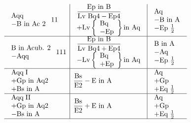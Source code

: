\documentclass[11pt,a4paper]{article}
\begin{document}
\[\begin{array}{l|l|l}
\begin{array}{l} \text{Aqq} \\ -\text{B in Ac 2} \end{array} \;\text{11} & \begin{array}{l} \dfrac{\text{Ep in B}}{\text{Lv Bq4} - \text{Ep4}} \\ +\text{Lv}\left\{\begin{array}{l} \text{Bq} \\ -\text{Ep} \end{array}\right\} \text{in Aq} \end{array} & \begin{array}{l} \text{Aq} \\ -\text{B in A} \\ -\text{Ep } \tfrac{1}{2} \end{array} \\ \hline
\begin{array}{l} \text{B in Acub. 2} \\ -\text{Aqq} \end{array} \;\text{111} & \begin{array}{l} \dfrac{\text{Ep in B}}{\text{Lv Bq4} + \text{Ep4}} \\ -\text{Lv}\left\{\begin{array}{l} \text{Bq} \\ +\text{Ep} \end{array}\right\} \text{in Aq} \end{array} & \begin{array}{l} \text{B in A} \\ -\text{Aq} \\ -\text{Ep } \tfrac{1}{2} \end{array} \\ \hline
\begin{array}{l} \text{Aqq} \;\text{I} \\ +\text{Gp in Aq2} \\ +\text{Bs in A} \end{array} & \dfrac{\text{Bs}}{\text{E2}} - \text{E in A} & \begin{array}{l} \text{Aq} \\ +\text{Gp} \\ +\text{Eq } \tfrac{1}{2} \end{array} \\ \hline
\begin{array}{l} \text{Aqq} \;\text{II} \\ +\text{Gp in Aq2} \\ -\text{Bs in A} \end{array} & \dfrac{\text{Bs}}{\text{E2}} + \text{E in A} & \begin{array}{l} \text{Aq} \\ +\text{Gp} \\ +\text{Eq } \tfrac{1}{2} \end{array} \\ \hline

\end{array}\]
\end{document}
